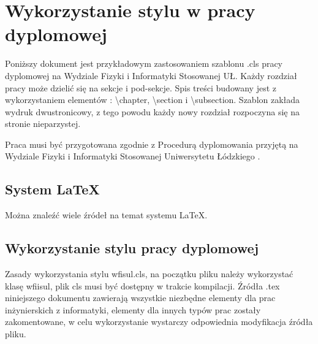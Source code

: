 \documentclass{wfiisul}
\begin{document}

\nralbumu{****}

\promotor{***}
\katedra{****}


\specjalizacja{****}






\stronatytulowa


\chapter{Wykorzystanie stylu w pracy dyplomowej}

Poniższy dokument jest przykładowym zastosowaniem szablonu .cls pracy dyplomowej na Wydziale Fizyki i Informatyki Stosowanej UŁ. Każdy rozdział pracy może dzielić się na sekcje i pod-sekcje. Spis treści budowany jest z wykorzystaniem elementów : {\textbackslash}chapter, {\textbackslash}section i {\textbackslash}subsection. Szablon zakłada wydruk dwustronicowy, z tego powodu każdy nowy rozdział rozpoczyna się na stronie nieparzystej.

Praca musi być przygotowana zgodnie z Procedurą dyplomowania przyjętą na Wydziale Fizyki i Informatyki Stosowanej Uniwersytetu Łódzkiego \cite{Procedura_dyplomowania}.
\section{System \LaTeX}
Można znaleźć wiele źródeł na temat systemu \LaTeX \cite{latex_wiki}.

\section{Wykorzystanie stylu pracy dyplomowej}
Zasady wykorzystania stylu wfisul.cls, na początku pliku należy wykorzystać klasę wfiisul, plik cls musi być dostępny w trakcie kompilacji. Źródła .tex niniejszego dokumentu zawierają wszystkie niezbędne elementy dla prac inżynierskich z informatyki, elementy dla innych typów prac zostały zakomentowane, w celu wykorzystanie wystarczy odpowiednia modyfikacja źródła pliku. 
\end{document}

